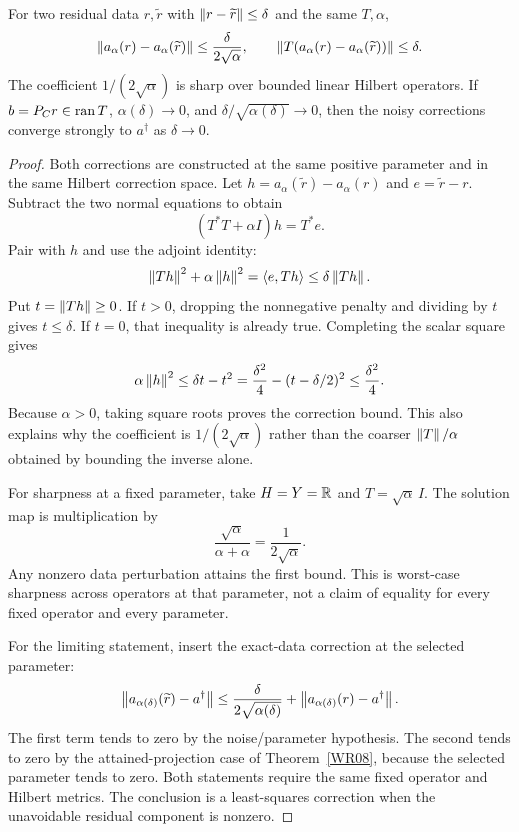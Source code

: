 \begin{theorem}\label{WR09}
For two residual data $r,\widetilde r$ with $\left\lVert r-\widetilde r\right\rVert\le\delta$ and the same $T,\alpha$,
\[
 \left\lVert a_\alpha(r)-a_\alpha(\widetilde r)\right\rVert
 \le\frac{\delta}{2\sqrt\alpha},\qquad
 \left\lVert T(a_\alpha(r)-a_\alpha(\widetilde r))\right\rVert\le\delta.
\]
The coefficient $1/(2\sqrt\alpha)$ is sharp over bounded linear Hilbert operators. If $b=P_Cr\in\operatorname{ran} T$, $\alpha(\delta)\to0$, and $\delta/\sqrt{\alpha(\delta)}\to0$, then the noisy corrections converge strongly to $a^\dagger$ as $\delta\to0$.
\end{theorem}
\begin{proof}
Both corrections are constructed at the same positive parameter and in the same Hilbert correction space. Let $h=a_\alpha(\widetilde r)-a_\alpha(r)$ and $e=\widetilde r-r$. Subtract the two normal equations to obtain
\[
 (T^*T+\alpha I)h=T^*e.
\]
Pair with $h$ and use the adjoint identity:
\[
 \left\lVert Th\right\rVert^2+\alpha\left\lVert h\right\rVert^2
 =\langle e,Th\rangle\le\delta\left\lVert Th\right\rVert.
\]
Put $t=\left\lVert Th\right\rVert\ge0$. If $t>0$, dropping the nonnegative penalty and dividing by $t$ gives $t\le\delta$. If $t=0$, that inequality is already true. Completing the scalar square gives
\[
 \alpha\left\lVert h\right\rVert^2\le\delta t-t^2
 =\frac{\delta^2}{4}-(t-\delta/2)^2
 \le\frac{\delta^2}{4}.
\]
Because $\alpha>0$, taking square roots proves the correction bound. This also explains why the coefficient is $1/(2\sqrt\alpha)$ rather than the coarser $\left\lVert T\right\rVert/\alpha$ obtained by bounding the inverse alone.

For sharpness at a fixed parameter, take $H=Y=\mathbb R$ and $T=\sqrt\alpha\,I$. The solution map is multiplication by
\[
 \frac{\sqrt\alpha}{\alpha+\alpha}=\frac1{2\sqrt\alpha}.
\]
Any nonzero data perturbation attains the first bound. This is worst-case sharpness across operators at that parameter, not a claim of equality for every fixed operator and every parameter.

For the limiting statement, insert the exact-data correction at the selected parameter:
\[
 \left\lVert a_{\alpha(\delta)}(\widetilde r)-a^\dagger\right\rVert
 \le\frac{\delta}{2\sqrt{\alpha(\delta)}}
       +\left\lVert a_{\alpha(\delta)}(r)-a^\dagger\right\rVert.
\]
The first term tends to zero by the noise/parameter hypothesis. The second tends to zero by the attained-projection case of Theorem~\ref{WR08}, because the selected parameter tends to zero. Both statements require the same fixed operator and Hilbert metrics. The conclusion is a least-squares correction when the unavoidable residual component is nonzero.
\end{proof}

